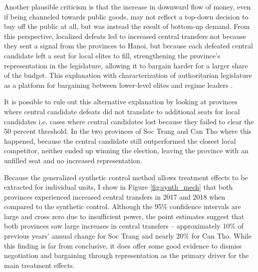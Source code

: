 \documentclass[12pt]{article}
\newcommand{\1}{\mathbbm{1}}
\begin{document}
Another plausible criticism is that the increase in downward flow of money, even if being channeled towards public goods, may not reflect a top-down decision to buy off the public at all, but was instead the result of bottom-up demand. From this perspective, localized defeats led to increased central transfers not because they sent a signal from the provinces to Hanoi, but because each defeated central candidate left a seat for local elites to fill, strengthening the province's representation in the legislature, allowing it to bargain harder for a larger share of the budget. This explanation with characterization of authoritarian legislature as a platform for bargaining between lower-level elites and regime leaders \citep[e.g][]{Magaloni2008}. 

It is possible to rule out this alternative explanation by looking at provinces where central candidate defeats did not translate to additional seats for local candidates i.e. cases where central candidates lost because they failed to clear the 50 percent threshold. In the two provinces of Soc Trang and Can Tho where this happened, because the central candidate still outperformed the closest local competitor, neither ended up winning the election, leaving the province with an unfilled seat and no increased representation. 

Because the generalized synthetic control method allows treatment effects to be extracted for individual units, I show in Figure \ref{fig:synth_mech} that both provinces experienced increased central transfers in 2017 and 2018 when compared to the synthetic control. Although the 95\% confidence intervals are large and cross zero due to insufficient power, the point estimates suggest that both provinces saw large increases in central transfers -- approximately 10\% of previous years' annual change for Soc Trang and nearly 20\% for Can Tho. While this finding is far from conclusive, it does offer some good evidence to dismiss negotiation and bargaining through representation as the primary driver for the main treatment effects.
\end{document}
